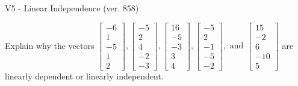 \begin{exercise}
  \begin{exerciseTitle}V5 - Linear Independence (ver. 858)\end{exerciseTitle}
  \begin{exerciseStatement}
    Explain why the vectors \(\left[\begin{array}{r}
-6 \\
1 \\
-5 \\
1 \\
2
\end{array}\right] , \left[\begin{array}{r}
-5 \\
2 \\
4 \\
-2 \\
-3
\end{array}\right] , \left[\begin{array}{r}
16 \\
-5 \\
-3 \\
3 \\
4
\end{array}\right] , \left[\begin{array}{r}
-5 \\
2 \\
-1 \\
-5 \\
-2
\end{array}\right] , \text{ and } \left[\begin{array}{r}
15 \\
-2 \\
6 \\
-10 \\
5
\end{array}\right]\) are linearly dependent or linearly independent.	



\end{exerciseStatement}
\end{exercise}
